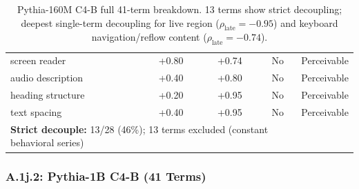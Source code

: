 \documentclass[10pt]{article} %
\begin{document}
\begin{table}[H]
\begin{tabular}{|l|c|c|c|l|}
screen reader & +0.80 & +0.74 & No & Perceivable \\
audio description & +0.40 & +0.80 & No & Perceivable \\
heading structure & +0.20 & +0.95 & No & Perceivable \\
text spacing & +0.40 & +0.95 & No & Perceivable \\
\hline
\multicolumn{4}{|l|}{\textbf{Strict decouple:} 13/28 (46\%); 13 terms excluded (constant behavioral series)} \\
\hline
\end{tabular}
\caption{Pythia-160M C4-B full 41-term breakdown. 13 terms show strict decoupling; deepest single-term decoupling for live region ($\rho_\text{late}=-0.95$) and keyboard navigation/reflow content ($\rho_\text{late}=-0.74$).}
\end{table}

\subsubsection*{A.1j.2: Pythia-1B C4-B (41 Terms)}
\end{document}
